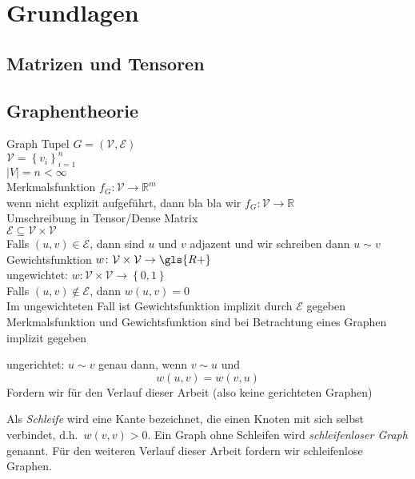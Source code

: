\chapter{Grundlagen}

\section{Matrizen und Tensoren}

\section{Graphentheorie}

Graph Tupel $G = \left(\mathcal{V}, \mathcal{E}\right)$\\
$\mathcal{V} = {\left\{ v_i \right\}}^n_{i=1}$\\
$\left| V \right| = n < \infty$\\
Merkmalsfunktion $f_G \colon \mathcal{V} \to \mathbb{R}^m$\\
wenn nicht explizit aufgeführt, dann bla bla wir $f_G \colon \mathcal{V} \to \mathbb{R}$\\
Umschreibung in Tensor/Dense Matrix\\
$\mathcal{E} \subseteq \mathcal{V} \times \mathcal{V}$\\
Falls $\left( u, v \right) \in \mathcal{E}$, dann sind $u$ und $v$ adjazent und wir schreiben dann $u \sim v$\\
Gewichtsfunktion $w \colon \mathcal{V} \times \mathcal{V} \to \gls{R+}$\\
ungewichtet: $w \colon \mathcal{V} \times \mathcal{V} \to \left\{ 0, 1 \right\}$\\
Falls $\left( u, v \right) \notin \mathcal{E}$, dann $w\left(u, v\right) = 0$\\
Im ungewichteten Fall ist Gewichtsfunktion implizit durch $\mathcal{E}$ gegeben\\
Merkmalsfunktion und Gewichtsfunktion sind bei Betrachtung eines Graphen implizit gegeben 

ungerichtet:
$u \sim v$ genau dann, wenn $v \sim u$ und
\begin{equation}
  w\left(u, v\right) = w\left(v, u\right)
\end{equation}
Fordern wir für den Verlauf dieser Arbeit (also keine gerichteten Graphen)

Als \emph{Schleife} wird eine Kante bezeichnet, die einen Knoten mit sich selbst verbindet, d.h.\ $w\left(v, v\right) > 0$.
Ein Graph ohne Schleifen wird \emph{schleifenloser Graph} genannt.
Für den weiteren Verlauf dieser Arbeit fordern wir schleifenlose Graphen.\\

